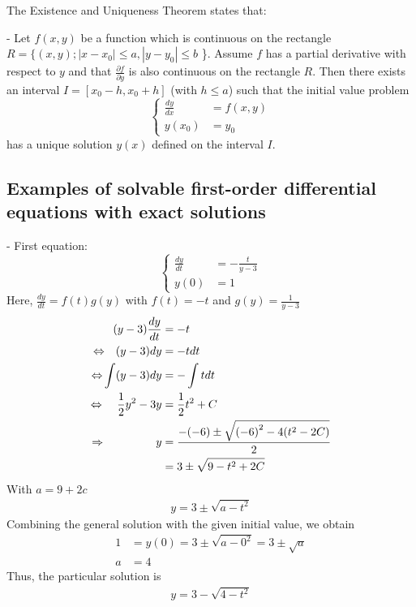 \documentclass[a4paper]{article}
\begin{document}
The Existence and Uniqueness Theorem states that:

- Let \(f(x,y)\) be a function which is continuous on the rectangle  \(R = \{(x, y); |x - x_0| \leq a, |y - y_0| \leq b\) \}.
Assume \(f\) has a partial derivative with respect to \(y\) and that \(\frac{\partial f}{\partial y}\) is also continuous on the rectangle \(R\).
Then there exists an interval \(I=[x_0-h, x_0+h]\) (with \(h \leq a\)) such that the initial value problem
\begin{equation*}
  \begin{cases}
    \frac{dy}{dx} & = f(x,y) \\
    y(x_0)        & = y_0
  \end{cases}
\end{equation*}
has a unique solution \(y(x)\) defined on the interval \(I\).

\subsection{Examples of solvable first-order differential equations with exact solutions}
- First equation:
\begin{equation*}
  \begin{cases}
    \frac{dy}{dt} & = - \frac{t}{y - 3} \\
    y(0)          & = 1
  \end{cases}
\end{equation*}
Here, \(\frac{dy}{dt} = f(t)g(y)\) with \(f(t) = -t\) and \(g(y) = \frac{1}{y-3}\)
\begin{align*}
  (y - 3) \frac{dy}{dt}                                     & = -t                                                \\
  {\color{black}\Leftrightarrow} ~~~ (y - 3) dy             & = -t dt                                             \\
  {\color{black}\Leftrightarrow}  \int (y - 3) dy           & = -\int tdt                                         \\
  {\color{black}\Leftrightarrow} ~~~~ \frac {1}{2} y^2 - 3y & = \frac{1}{2} t^2 + C                               \\
  {\color{black}\Rightarrow} ~~~~~~~~~~~~~~ y               & = \frac{-(-6) \pm \sqrt{{(-6)}^2 - 4(t^2 - 2C)}}{2} \\
                                                            & = 3 \pm \sqrt{9 - t^2 + 2C}
\end{align*}
With \(a = 9 + 2c\)
\begin{align*}
  y = 3 \pm \sqrt{a - t^2}
\end{align*}
Combining the general solution with the given initial value, we obtain
\begin{align*}
  1 & = y(0) = 3 \pm \sqrt{a - 0^2} = 3 \pm \sqrt{a} \\
  a & = 4
\end{align*}
Thus, the particular solution is
\begin{align*}
  y = 3 - \sqrt{4-t^2}
\end{align*} \\
\end{document}
